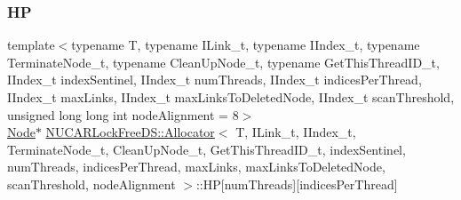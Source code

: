 \mbox{\label{class_n_u_c_a_r_lock_free_d_s_1_1_allocator_af296445f1e849188577b21cdc924b09e}} 
\subsubsection{\texorpdfstring{HP}{HP}}
{\footnotesize\ttfamily template$<$typename T, typename I\+Link\+\_\+t, typename I\+Index\+\_\+t, typename Terminate\+Node\+\_\+t, typename Clean\+Up\+Node\+\_\+t, typename Get\+This\+Thread\+I\+D\+\_\+t, I\+Index\+\_\+t index\+Sentinel, I\+Index\+\_\+t num\+Threads, I\+Index\+\_\+t indices\+Per\+Thread, I\+Index\+\_\+t max\+Links, I\+Index\+\_\+t max\+Links\+To\+Deleted\+Node, I\+Index\+\_\+t scan\+Threshold, unsigned long long int node\+Alignment = 8$>$ \\
\mbox{\hyperlink{class_n_u_c_a_r_lock_free_d_s_1_1_allocator_1_1_node}{Node}}$\ast$ \mbox{\hyperlink{class_n_u_c_a_r_lock_free_d_s_1_1_allocator}{N\+U\+C\+A\+R\+Lock\+Free\+D\+S\+::\+Allocator}}$<$ T, I\+Link\+\_\+t, I\+Index\+\_\+t, Terminate\+Node\+\_\+t, Clean\+Up\+Node\+\_\+t, Get\+This\+Thread\+I\+D\+\_\+t, index\+Sentinel, num\+Threads, indices\+Per\+Thread, max\+Links, max\+Links\+To\+Deleted\+Node, scan\+Threshold, node\+Alignment $>$\+::HP\mbox{[}num\+Threads\mbox{]}\mbox{[}indices\+Per\+Thread\mbox{]}\hspace{0.3cm}{\ttfamily [private]}}

\mbox{\label{class_n_u_c_a_r_lock_free_d_s_1_1_allocator_aa04805cb0313b2b7cfd5c76830fdb0c8}} 
